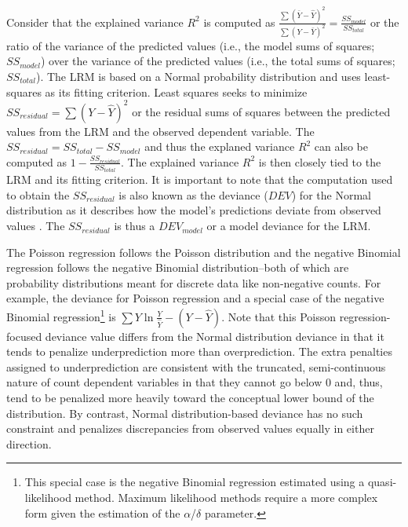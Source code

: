 \documentclass[man]{apa7}
\begin{document}
	Consider that the explained variance $R^2$ is computed as $\frac{\sum (\bar{Y} - \hat{Y})^2}{\sum (Y - \bar{Y})^2} = \frac{SS_{model}}{SS_{total}}$ or the ratio of the variance of the predicted values (i.e., the model sums of squares; $SS_{model}$) over the variance of the predicted values (i.e., the total sums of squares; $SS_{total}$).
	The LRM is based on a Normal probability distribution and uses least-squares as its fitting criterion.
	Least squares seeks to minimize $SS_{residual} = \sum (Y - \hat{Y})^2$ or the residual sums of squares between the predicted values from the LRM and the observed dependent variable. 
	The $SS_{residual} = SS_{total} - SS_{model}$ and thus the explaned variance $R^2$ can also be computed as $1 - \frac{SS_{residual}}{SS_{total}}$.
	The explained variance $R^2$ is then closely tied to the LRM and its fitting criterion.
	It is important to note that the computation used to obtain the $SS_{residual}$ is also known as the deviance ($DEV$) for the Normal distribution as it describes how the model's predictions deviate from observed values \parencite{mccullagh2019generalized}.
	The $SS_{residual}$ is thus a $DEV_{model}$ or a model deviance for the LRM.
	
	The Poisson regression follows the Poisson distribution and the negative Binomial regression follows the negative Binomial distribution--both of which are probability distributions meant for discrete data like non-negative counts.
	For example, the deviance for Poisson regression and a special case of the negative Binomial regression\footnote{
		This special case is the negative Binomial regression estimated using a quasi-likelihood method. 
		Maximum likelihood methods require a more complex form given the estimation of the $\alpha$/$\delta$ parameter.} 
	is $\sum Y\ln \frac{Y}{\hat{Y}} - (Y - \hat{Y})$. 
	Note that this Poisson regression-focused deviance value differs from the Normal distribution deviance in that it tends to penalize underprediction more than overprediction.
	The extra penalties assigned to underprediction are consistent with the truncated, semi-continuous nature of count dependent variables in that they cannot go below 0 and, thus, tend to be penalized more heavily toward the conceptual lower bound of the distribution.
	By contrast, Normal distribution-based deviance has no such constraint and penalizes discrepancies from observed values equally in either direction.
	
\end{document}
